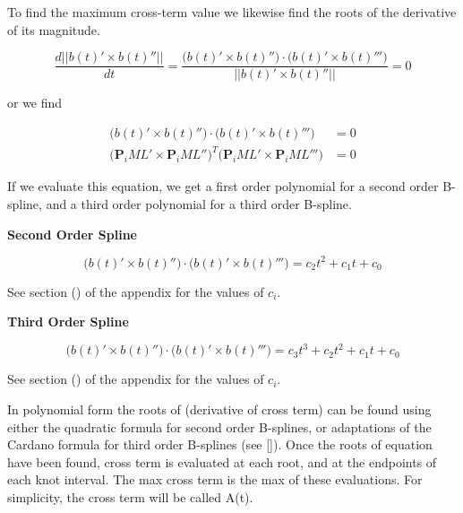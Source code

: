 \documentclass{article}
\begin{document}
To find the maximum cross-term value we likewise find the roots of the derivative of its magnitude.

\begin{equation}
    \frac{d||b(t)' \times b(t)''||}{dt} = \frac{\big(b(t)' \times b(t)''\big) \cdot \big(b(t)' \times b(t)'''\big)}{||b(t)' \times b(t)''||} = 0
\end{equation}

or we find

\begin{equation} \label{derivative of cross term}
\begin{aligned}
    \big(b(t)' \times b(t)''\big) \cdot \big(b(t)' \times b(t)'''\big) &= 0 \\
    \big(\textbf{P}_iML' \times \textbf{P}_iML''\big)^{T} \big(\textbf{P}_iML' \times \textbf{P}_iML'''\big) &= 0 
\end{aligned}
\end{equation}

If we evaluate this equation, we get a first order polynomial for a second order B-spline, and a third order polynomial for a third order B-spline. 

\hspace{1cm}

    \textbf{Second Order Spline}
    
\hspace{1cm}

\begin{equation}
    \big(b(t)' \times b(t)''\big) \cdot \big(b(t)' \times b(t)'''\big) = c_2 t^2 + c_1 t + c_0
\end{equation}

See section () of the appendix for the values of \(c_i\).

\hspace{1cm}

    \textbf{Third Order Spline}
    
\hspace{1cm}

\begin{equation}
    \big(b(t)' \times b(t)''\big) \cdot \big(b(t)' \times b(t)'''\big) = c_3 t^3 + c_2 t^2 + c_1 t + c_0
\end{equation}

See section () of the appendix for the values of \(c_i\).

In polynomial form the roots of ({derivative of cross term}) can be found using either the quadratic formula for second order B-splines, or adaptations of the Cardano formula for third order B-splines (see []). Once the roots of equation have been found, cross term is evaluated at each root, and at the endpoints of each knot interval. The max cross term is the max of these evaluations. For simplicity, the cross term will be called A(t).
\end{document}
